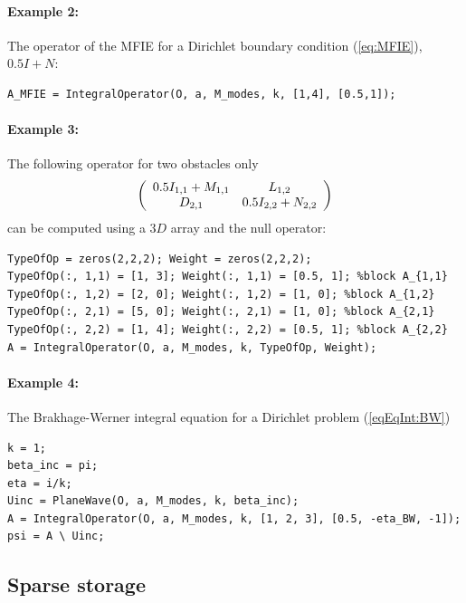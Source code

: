 \paragraph{Example 2:} The operator of the MFIE for a Dirichlet boundary condition (\ref{eq:MFIE}), $0.5I + N$:
\begin{lstlisting}
A_MFIE = IntegralOperator(O, a, M_modes, k, [1,4], [0.5,1]);
\end{lstlisting}
\paragraph{Example 3:} The following operator for two obstacles only
$$
\left(\begin{array}{c c}
0.5 I_{1,1}+ M_{1,1} & L_{1,2}\\
D_{2,1} & 0.5 I_{2,2}+N_{2,2}
\end{array}\right)
$$
can be computed using a $3D$ array and the null operator:
\begin{lstlisting}
TypeOfOp = zeros(2,2,2); Weight = zeros(2,2,2);
TypeOfOp(:, 1,1) = [1, 3]; Weight(:, 1,1) = [0.5, 1]; %block A_{1,1}
TypeOfOp(:, 1,2) = [2, 0]; Weight(:, 1,2) = [1, 0]; %block A_{1,2}
TypeOfOp(:, 2,1) = [5, 0]; Weight(:, 2,1) = [1, 0]; %block A_{2,1}
TypeOfOp(:, 2,2) = [1, 4]; Weight(:, 2,2) = [0.5, 1]; %block A_{2,2}
A = IntegralOperator(O, a, M_modes, k, TypeOfOp, Weight);
\end{lstlisting}
\paragraph{Example 4:} The Brakhage-Werner integral equation for a Dirichlet problem (\ref{eqEqInt:BW})
\begin{lstlisting}
k = 1;
beta_inc = pi;
eta = i/k;
Uinc = PlaneWave(O, a, M_modes, k, beta_inc);
A = IntegralOperator(O, a, M_modes, k, [1, 2, 3], [0.5, -eta_BW, -1]);
psi = A \ Uinc;
\end{lstlisting}

\subsection{Sparse storage}
\label{secFun:SpBlockSingleLayer}
\label{secFun:SpBlockDnSingleLayer}
\label{secFun:SpBlockDoubleLayer}
\label{secFun:SpBlockDnDoubleLayer}
\label{secFun:SpBlockPrecondDirichlet}
\label{secFun:SpBlockPrecondNeumann}
\label{secFun:SpBlockIdentity}
\label{secFun:SpSingleLayer}
\label{secFun:SpDnSingleLayer}
\label{secFun:SpDoubleLayer}
\label{secFun:SpDnDoubleLayer}
\label{secFun:SpPrecondDirichlet}
\label{secFun:SpPrecondNeumann}
\label{secFun:SpIdentity}

